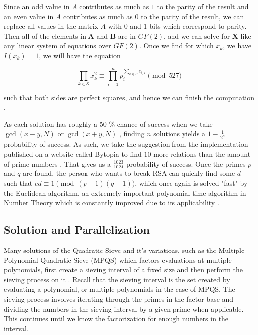 \documentclass[11pt,twocolumn]{article}
\begin{document}
\indent Since an odd value in $A$ contributes as much as $1$ to the parity of the result and an even value in $A$ contributes as much as $0$ to the parity of the result, we can replace all values in the matrix $A$ with 0 and 1 bits which correspond to parity. Then all of the elements in $\mathbf{A}$ and $\mathbf{B}$ are in $GF(2)$, and we can solve for $\mathbf{X}$ like any linear system of equations over $GF(2)$. Once we find for which $x_k$, we have $I(x_k) = 1$, we will have the equation

$$\displaystyle \prod_{k \in S} x_k^2 \equiv  \displaystyle \prod_{i = 1}^n p_i^{\displaystyle \sum_{k \in S} e_{i, k}} \pmod{527}$$

such that both sides are perfect squares, and hence we can finish the computation \cite{landquist:qs}.

\indent As each solution has roughly a 50 \% chance of success when we take $\gcd(x - y, N)$ or $\gcd(x + y, N)$ \cite{asbrink:parallelqs}, finding $n$ solutions yields a $1 - \frac{1}{2^n}$ probability of success. As such, we take the suggestion from the implementation published on a website called Bytopia to find $10$ more relations than the amount of prime numbers \cite{bytopia:help}. That gives us a $\frac{1023}{1024}$ probability of success. Once the primes $p$ and $q$ are found, the person who wants to break RSA can quickly find some $d$ such that $ed \equiv 1 \pmod{(p-1)(q-1)}$, which once again is solved "fast" by the Euclidean algorithm, an extremely important polynomial time algorithm in Number Theory which is constantly improved due to its applicability \cite{collins:euclid}.


\subsection{Solution and Parallelization}
Many solutions of the Quadratic Sieve and it's variations, such as the Multiple Polynomial Quadratic Sieve (MPQS) which factors evaluations at multiple polynomials, first create a sieving interval of a fixed size and then perform the sieving process on it \cite{bytopia:help}. Recall that the sieving interval is the set created by evaluating a polynomial, or multiple polynomials in the case of MPQS. The sieving process involves iterating through the primes in the factor base and dividing the numbers in the sieving interval by a given prime when applicable. This continues until we know the factorization for enough numbers in the interval.
\end{document}
